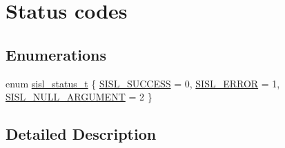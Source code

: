 \hypertarget{group__status}{\section{Status codes}
\label{group__status}
}
\subsection*{Enumerations}
\begin{DoxyCompactItemize}
\item 
enum \hyperlink{group__status_ga82c112a16803c9ddebc065a1b0f16287}{sisl\-\_\-status\-\_\-t} \{ \hyperlink{group__status_gga82c112a16803c9ddebc065a1b0f16287a60b9f04752a2c4dd6214f8a4fd7d913b}{S\-I\-S\-L\-\_\-\-S\-U\-C\-C\-E\-S\-S} =  0, 
\hyperlink{group__status_gga82c112a16803c9ddebc065a1b0f16287a333a15fde6c5ab88e3f7448240815f5a}{S\-I\-S\-L\-\_\-\-E\-R\-R\-O\-R} =  1, 
\hyperlink{group__status_gga82c112a16803c9ddebc065a1b0f16287a68c2b945ac9193d3b47b0cc0e6fb38d3}{S\-I\-S\-L\-\_\-\-N\-U\-L\-L\-\_\-\-A\-R\-G\-U\-M\-E\-N\-T} =  2
 \}
\end{DoxyCompactItemize}


\subsection{Detailed Description}


